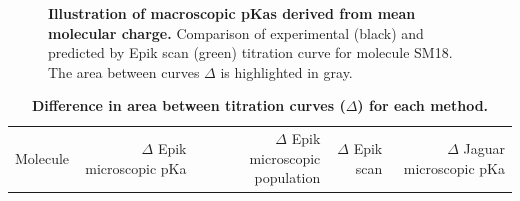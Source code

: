 \documentclass[9pt,lineno]{elife}
\begin{document}
\begin{figure}[H]
    \caption{{\bf Illustration of macroscopic pKas derived from mean molecular charge.}
    Comparison of experimental (black) and predicted by Epik scan (green) titration curve for molecule SM18. The area between curves $\Delta$ is highlighted in gray.}
    \label{fig:charge-curves}
\end{figure}

\begin{table}[H]
    \centering
    \caption{{\bf Difference in area between titration curves ($\Delta$) for each method.} }
    \label{tab:titration_curves}
    \begin{tabular}{lrrrr}
\toprule
Molecule &  $\Delta$ Epik microscopic pKa &  $\Delta$ Epik microscopic population  &  $\Delta$ Epik scan &  $\Delta$ Jaguar microscopic pKa \\


\end{tabular}
\end{table}
\end{document}
